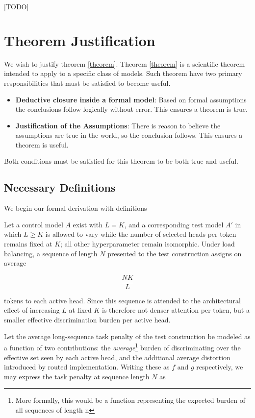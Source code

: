 \documentclass[11pt]{article}
\begin{document}
[TODO]




\appendix


\section{Theorem Justification}
\label{app:proof}

We wish to justify theorem \ref{theorem}. Theorem \ref{theorem} is a scientific theorem intended to apply to a specific class of models. Such theorem have two primary responsibilities that must be satisfied to become useful.

\begin{itemize}
    \item \textbf{Deductive closure inside a formal model}: Based on formal assumptions the conclusions follow logically without error. This ensures a theorem is true.
    \item \textbf{Justification of the Assumptions}: There is reason to believe the assumptions are true in the world, so the conclusion follows. This ensures a theorem is useful.
\end{itemize}

Both conditions must be satisfied for this theorem to be both true and useful.

\subsection{Necessary Definitions}

We begin our formal derivation with definitions

Let a control model $A$ exist with $L=K$, and a corresponding test model $A'$ in which $L\ge K$ is allowed to vary while the number of selected heads per token remains fixed at $K$; all other hyperparameter remain isomorphic. Under load balancing, a sequence of length $N$ presented to the test construction assigns on average

\begin{equation}
\frac{NK}{L}
\end{equation}

tokens to each active head. Since this sequence is attended to the architectural effect of increasing $L$ at fixed $K$ is therefore not denser attention per token, but a smaller effective discrimination burden per active head.

Let the average long-sequence task penalty of the test construction be modeled as a function of two contributions: the \emph{average}\footnote{More formally, this would be a function representing the expected burden of all sequences of length n} burden of discriminating over the effective set seen by each active head, and the additional average distortion introduced by routed implementation. Writing these as $f$ and $g$ respectively, we may express the task penalty at sequence length $N$ as
\end{document}
